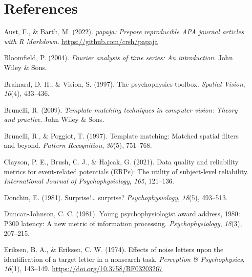 \documentclass[
  man]{apa7}
\newlength{\cslhangindent}
\newlength{\cslentryspacingunit} %
\newenvironment{CSLReferences}[2] %
 {%
  \setlength{\parindent}{0pt}
  \ifodd #1
  \let\oldpar\par
  \def\par{\hangindent=\cslhangindent\oldpar}
  \fi
  \setlength{\parskip}{#2\cslentryspacingunit}
 }%
 {}
\begin{document}
\newpage

\hypertarget{references}{%
\section{References}\label{references}}

\hypertarget{refs}{}
\begin{CSLReferences}{1}{0}
\leavevmode{}%
Aust, F., \& Barth, M. (2022). \emph{{papaja}: {Prepare} reproducible {APA} journal articles with {R Markdown}}. \url{https://github.com/crsh/papaja}

\leavevmode{}%
Bloomfield, P. (2004). \emph{Fourier analysis of time series: An introduction}. John Wiley \& Sons.

\leavevmode{}%
Brainard, D. H., \& Vision, S. (1997). The psychophysics toolbox. \emph{Spatial Vision}, \emph{10}(4), 433--436.

\leavevmode{}%
Brunelli, R. (2009). \emph{Template matching techniques in computer vision: Theory and practice}. John Wiley \& Sons.

\leavevmode{}%
Brunelli, R., \& Poggiot, T. (1997). Template matching: {Matched} spatial filters and beyond. \emph{Pattern Recognition}, \emph{30}(5), 751--768.

\leavevmode{}%
Clayson, P. E., Brush, C. J., \& Hajcak, G. (2021). Data quality and reliability metrics for event-related potentials ({ERPs}): {The} utility of subject-level reliability. \emph{International Journal of Psychophysiology}, \emph{165}, 121--136.

\leavevmode{}%
Donchin, E. (1981). Surprise!\ldots{} surprise? \emph{Psychophysiology}, \emph{18}(5), 493--513.

\leavevmode{}%
Duncan-Johnson, C. C. (1981). Young psychophysiologist award address, 1980: {P300} latency: A new metric of information processing. \emph{Psychophysiology}, \emph{18}(3), 207--215.

\leavevmode{}%
Eriksen, B. A., \& Eriksen, C. W. (1974). Effects of noise letters upon the identification of a target letter in a nonsearch task. \emph{Perception \& Psychophysics}, \emph{16}(1), 143--149. \url{https://doi.org/10.3758/BF03203267}


\end{CSLReferences}
\end{document}
